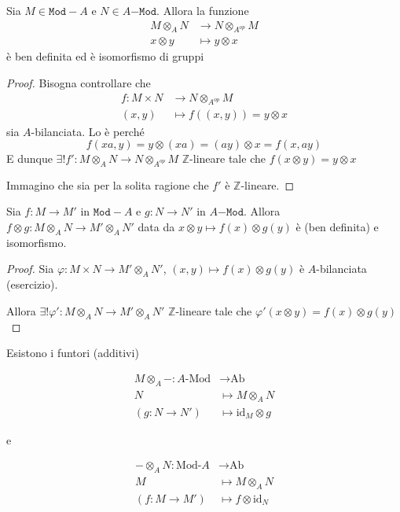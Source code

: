 \begin{proposition}{}
    Sia \(M \in \mathtt{Mod-}A\) e \(N \in A\mathtt{-Mod}\). Allora la funzione
    \begin{align*}
        M \otimes_A N &\to N \otimes_{A^{op}} M \\
        x \otimes y & \mapsto y \otimes x
    \end{align*}
    è ben definita ed è isomorfismo di gruppi
\end{proposition}
\begin{proof}{}
    Bisogna controllare che \begin{align*}
        f: M \times N &\longrightarrow N \otimes_{A^{op}} M \\
        {(x,y)} &\longmapsto f({(x,y)}) = y \otimes x
    \end{align*}
    sia \(A\)-bilanciata. Lo è perché
    \[
      f{(xa, y)} = y \otimes {(xa)} = {(ay)} \otimes x = f{(x, ay)}
    \]
    E dunque \(\exists ! f' : M \otimes_A N \to N \otimes_{A^{op}} M\)
    \(\mathbb{Z}\)-lineare tale che \(f{(x \otimes y)} = y \otimes x\) 

    Immagino che sia per la solita ragione che \(f'\) è \(\mathbb{Z}\)-lineare. %
\end{proof}

\begin{proposition}{}
    Sia \(f : M \to M'\) in \(\mathtt{Mod-}A\) e \(g: N \to N'\) in
    \(A\mathtt{-Mod}\). Allora \(f \otimes g : M \otimes_A N \to M' \otimes_A
    N'\) data da \(x \otimes y \mapsto f{(x)} \otimes g{(y)}\) è (ben definita)
    e isomorfismo.
\end{proposition}
\begin{proof}{}
    Sia \(\varphi : M \times N \to M' \otimes_A N'\), \({(x,y)} \mapsto
    f{(x)} \otimes g{(y)}\)  è \(A\)-bilanciata
    (esercizio). %

    Allora \(\exists ! \varphi ' : M \otimes_A N \to M' \otimes_A N'\)
    \(\mathbb{Z}\)-lineare tale che \(\varphi'{(x \otimes y)} = f{(x)} \otimes
    g{(y)}\) 
\end{proof}
\begin{corollary}{} Esistono i funtori (additivi) \\
\begin{minipage}{0.48\textwidth}
    \begin{align*}
        M\otimes_A -: A\text{-Mod} &\longrightarrow \text{Ab} \\
        N &\longmapsto  M \otimes_A N \\
        (g : N \to N') &\longmapsto \mathrm{id}_M \otimes g
    \end{align*}
\end{minipage}
e
\hfill
\begin{minipage}{0.48\textwidth}
    \begin{align*}
        - \otimes_A N: \text{Mod-}A &\longrightarrow \text{Ab} \\
        M &\longmapsto M \otimes_A N \\
        (f : M \to M') &\longmapsto f \otimes \mathrm{id}_N
    \end{align*}
\end{minipage}
\end{corollary}

